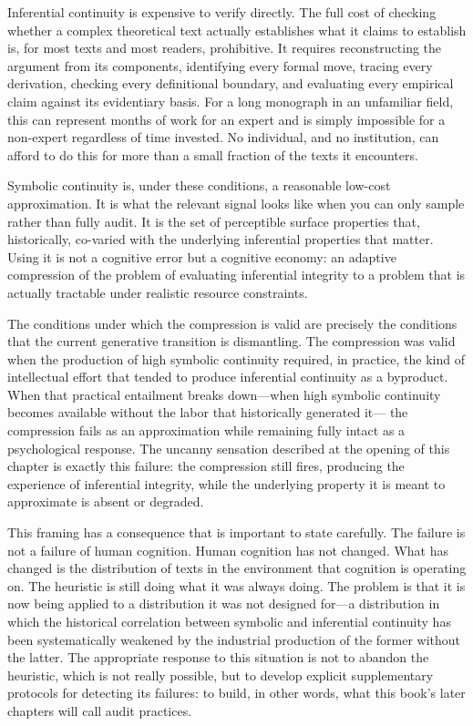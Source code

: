 \documentclass[12pt, openright, twoside]{book}
\begin{document}
Inferential continuity is expensive to verify directly. The full cost of checking
whether a complex theoretical text actually establishes what it claims to establish
is, for most texts and most readers, prohibitive. It requires reconstructing the
argument from its components, identifying every formal move, tracing every
derivation, checking every definitional boundary, and evaluating every empirical
claim against its evidentiary basis. For a long monograph in an unfamiliar field,
this can represent months of work for an expert and is simply impossible for
a non-expert regardless of time invested. No individual, and no institution, can
afford to do this for more than a small fraction of the texts it encounters.

Symbolic continuity is, under these conditions, a reasonable low-cost approximation.
It is what the relevant signal looks like when you can only sample rather than
fully audit. It is the set of perceptible surface properties that, historically,
co-varied with the underlying inferential properties that matter. Using it is
not a cognitive error but a cognitive economy: an adaptive compression of the
problem of evaluating inferential integrity to a problem that is actually tractable
under realistic resource constraints.

The conditions under which the compression is valid are precisely the conditions
that the current generative transition is dismantling. The compression was valid
when the production of high symbolic continuity required, in practice, the
kind of intellectual effort that tended to produce inferential continuity as a
byproduct. When that practical entailment breaks down---when high symbolic
continuity becomes available without the labor that historically generated it---
the compression fails as an approximation while remaining fully intact as a
psychological response. The uncanny sensation described at the opening of this
chapter is exactly this failure: the compression still fires, producing the
experience of inferential integrity, while the underlying property it is meant
to approximate is absent or degraded.

This framing has a consequence that is important to state carefully. The failure
is not a failure of human cognition. Human cognition has not changed. What has
changed is the distribution of texts in the environment that cognition is
operating on. The heuristic is still doing what it was always doing. The problem
is that it is now being applied to a distribution it was not designed for---a
distribution in which the historical correlation between symbolic and inferential
continuity has been systematically weakened by the industrial production of the
former without the latter. The appropriate response to this situation is not
to abandon the heuristic, which is not really possible, but to develop explicit
supplementary protocols for detecting its failures: to build, in other words,
what this book's later chapters will call audit practices.
\end{document}
